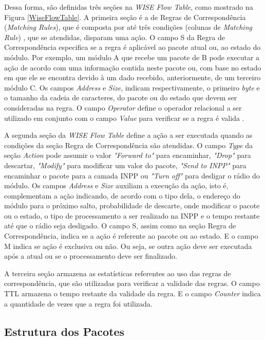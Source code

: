 Dessa forma, são definidas três seções na \textit{WISE Flow Table}, como mostrado na Figura \ref{WiseFlowTable}. A primeira seção é a de Regras de Correspondência (\textit{Matching Rules}), que é composta por até três condições (colunas de \textit{Matching Rule}) , que se atendidas, disparam uma ação. O campo S da Regra de Correspondência especifica se a regra é aplicável ao pacote atual ou, ao estado do módulo. Por exemplo, um módulo A que recebe um pacote de B pode executar a ação de acordo com uma informação contida neste pacote ou, com base no estado em que ele se encontra devido à um dado recebido, anteriormente, de um terceiro módulo C. Os campos \textit{Address} e \textit{Size}, indicam respectivamente, o primeiro \textit{byte} e o tamanho da cadeia de caracteres, do pacote ou do estado que devem ser consideradas na regra. O campo \textit{Operator} define o operador relacional a ser utilizado em conjunto com o campo \textit{Value} para verificar se a regra é valida \cite{galluccio2015sdn}.

A segunda seção da \textit{WISE Flow Table} define a ação a ser executada quando as condições da seção Regra de Correspondência são atendidas. O campo \textit{Type} da seção \textit{Action} pode assumir o valor \textit{"Forward to"} para encaminhar, \textit{"Drop"}  para descartar, \textit{"Modify"} para modificar um valor do pacote, \textit{"Send to INPP"} para encaminhar o pacote para a camada \ac{INPP} ou \textit{"Turn off"} para desligar o rádio do módulo. Os campos \textit{Address} e \textit{Size} auxiliam a execução da ação, isto é, complementam a ação indicando, de acordo com o tipo dela, o endereço do módulo para o próximo salto, probabilidade de descarte, onde modificar o pacote ou o estado, o tipo de processamento a ser realizado na \ac{INPP} e o tempo restante até que o rádio seja desligado. O campo S, assim como na seção Regra de Correspondência, indica se a ação é referente ao pacote ou ao estado. E o campo M indica se ação é exclusiva ou não. Ou seja, se outra ação deve ser executada após a atual ou se o processamento deve ser finalizado. 

A terceira seção armazena as estatísticas referentes ao uso das regras de correspondência, que são utilizadas para verificar a validade das regras. O campo \ac{TTL} armazena o tempo restante da validade da regra. E o campo \textit{Counter} indica a quantidade de vezes que a regra foi utilizada.

\subsection{Estrutura dos Pacotes}


